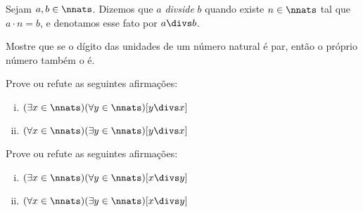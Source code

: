 \begin{definition}
Sejam $a,b \in \nnats$. Dizemos que $a$ \textit{divside} $b$ quando existe $n \in \nnats$ tal que $a \cdot n = b$, e denotamos esse fato por $a \divs b$.
\end{definition}

\begin{exercise}
%
Mostre que se o dígito das unidades de um número natural é par, então o próprio número também o é.
\end{exercise}

\begin{exercise}
%
Prove ou refute as seguintes afirmações:

\begin{enumerate}[(i)]
\item $(\exists x \in \nnats)( \forall y \in \nnats)[ y \divs x]$
\item $(\forall x \in \nnats)( \exists y \in \nnats)[ y \divs x]$
\end{enumerate}

\begin{homework}
%
Prove ou refute as seguintes afirmações:
\begin{enumerate}[(i)]
\item $(\exists x \in \nnats)( \forall y \in \nnats)[ x \divs y]$
\item $(\forall x \in \nnats)( \exists y \in \nnats)[ x \divs y]$
\end{enumerate}
\end{homework}

\end{exercise}